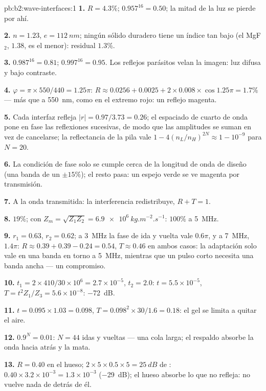 \begin{solution}{pb:b2:wave-interfaces:1}
\textbf{1.} $R = 4.3\%$; $0.957^{16} = 0.50$; la mitad de la luz se pierde por ahí.

\textbf{2.} $n = 1.23$, $e = \qty{112}{nm}$; ningún sólido duradero tiene un
índice tan bajo (el MgF$_2$, $1.38$, es el menor): residual $1.3\%$.

\textbf{3.} $0.987^{16} = 0.81$; $0.997^{16} = 0.95$. Los reflejos parásitos velan la
imagen: luz difusa y bajo contraste.

\textbf{4.} $\varphi = \pi \times 550/440 = 1.25\pi$: $R \approx 0.0256 + 0.0025 + 2 \times 0.008 \times
\cos1.25\pi = 1.7\%$ --- más que a \qty{550}{nm}, como en el extremo rojo: un
reflejo magenta.

\textbf{5.} Cada interfaz refleja $|r| = 0.97/3.73 = 0.26$; el espaciado de cuarto
de onda pone en fase las reflexiones sucesivas, de modo que las amplitudes se suman
en vez de cancelarse; la reflectancia de la pila vale $1 - 4(n_L/n_H)^{2N}
\approx 1 - 10^{-9}$ para $N = 20$.

\textbf{6.} La condición de fase solo se cumple cerca de la longitud de onda
de diseño (una banda de un $\pm15\%$); el resto pasa: un espejo verde
se ve magenta por transmisión.

\textbf{7.} A la onda transmitida: la interferencia redistribuye,
$R + T = 1$.

\textbf{8.} $19\%$; con $Z_m = \sqrt{Z_1Z_2} = \qty{6.9e6}{kg.m^{-2}.s^{-1}}$: $100\%$ a
\qty{5}{MHz}.

\textbf{9.} $r_1 = 0.63$, $r_2 = 0.62$; a \qty{3}{MHz} la fase de ida y vuelta vale
$0.6\pi$, y a \qty{7}{MHz}, $1.4\pi$: $R \approx 0.39 + 0.39 - 0.24 = 0.54$, $T \approx 0.46$
en ambos casos: la adaptación solo vale en una banda en torno a \qty{5}{MHz}, mientras que un
pulso corto necesita una banda ancha --- un compromiso.

\textbf{10.} $t_1 = 2 \times 410/30 \times 10^6 = 2.7 \times 10^{-5}$, $t_2 = 2.0$: $t = 5.5 \times 10^{-5}$,
$T = t^2Z_1/Z_3 = 5.6 \times 10^{-8}$: \qty{-72}{dB}.

\textbf{11.} $t = 0.095 \times 1.03 = 0.098$, $T = 0.098^2 \times 30/1.6 = 0.18$: el gel
se limita a quitar el aire.

\textbf{12.} $0.9^N = 0.01$: $N = 44$ idas y vueltas --- una cola larga; el
respaldo absorbe la onda hacia atrás y la mata.

\textbf{13.} $R = 0.40$ en el hueso; $2 \times 5 \times 0.5 \times 5 = \qty{25}{dB}$ de
: $0.40 \times 3.2 \times 10^{-3} = 1.3 \times 10^{-3}$ (\qty{-29}{dB}); el hueso
absorbe lo que no refleja: no vuelve nada de detrás de él.


\end{solution}
